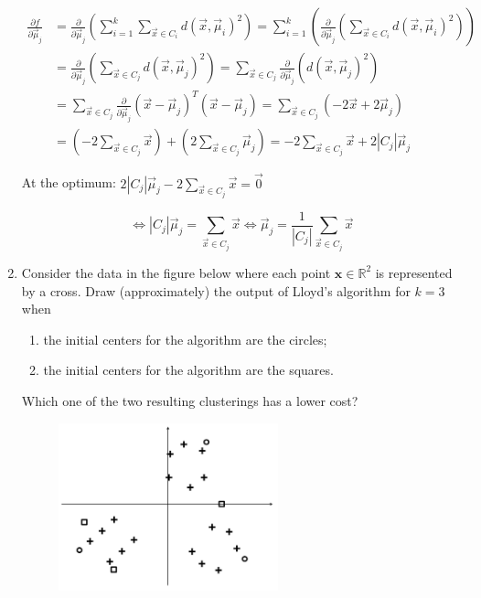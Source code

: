 \documentclass[a4paper,11pt,oneside]{book}
\begin{document}
\begin{enumerate}
\begin{solution}
            \begin{align*}
            \frac{\partial f}{\partial \vec{\mu}_j} &= \frac{\partial}{\partial \vec{\mu}_j}(\sum_{i=1}^k \sum_{\vec{x}\in C_i} d(\vec{x},\vec{\mu}_i)^2) = \sum_{i=1}^k(\frac{\partial}{\partial \vec{\mu}_j}(\sum_{\vec{x}\in C_i} d(\vec{x},\vec{\mu}_i)^2)) \\
            &= \frac{\partial}{\partial \vec{\mu}_j}(\sum_{\vec{x}\in C_j} d(\vec{x},\vec{\mu}_j)^2) = \sum_{\vec{x}\in C_j} \frac{\partial}{\partial \vec{\mu}_j}(d(\vec{x},\vec{\mu}_j)^2) \\
            &= \sum_{\vec{x}\in C_j} \frac{\partial}{\partial \vec{\mu}_j}(\vec{x}-\vec{\mu}_j)^T(\vec{x}-\vec{\mu}_j) = \sum_{\vec{x}\in C_j} (-2\vec{x}+2\vec{\mu}_j) \\
            &= (-2\sum_{\vec{x}\in C_j} \vec{x}) + (2\sum_{\vec{x}\in C_j} \vec{\mu}_j) = -2\sum_{\vec{x}\in C_j} \vec{x} + 2|C_j|\vec{\mu}_j
            \end{align*}
            
            At the optimum: $2|C_j|\vec{\mu}_j - 2\sum_{\vec{x}\in C_j} \vec{x} = \vec{0}$
            
            $$\Leftrightarrow |C_j|\vec{\mu}_j = \sum_{\vec{x}\in C_j} \vec{x} \Leftrightarrow \vec{\mu}_j = \frac{1}{|C_j|} \sum_{\vec{x}\in C_j} \vec{x}$$
        \end{solution}
    \clearpage
    \item Consider the data in the figure below where each point $\mathbf{x} \in \mathbb{R}^2$ is represented by a cross. Draw (approximately) the output of Lloyd's algorithm for $k = 3$ when
        \begin{enumerate}
            \item the initial centers for the algorithm are the circles;
            \item the initial centers for the algorithm are the squares.
        \end{enumerate}
        Which one of the two resulting clusterings has a lower cost?
    
        \begin{figure}[H]
            \centering
            \includegraphics[width=0.6\textwidth,height=0.4\textheight,keepaspectratio]{images/4_31_Jan_2019.png}
        \end{figure}


\end{enumerate}
\end{document}
